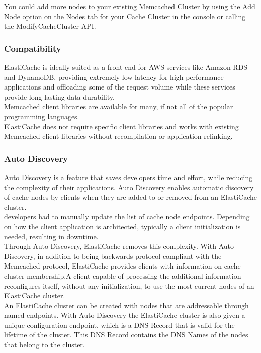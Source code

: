 \documentclass[12pt, letterpaper, twoside]{article}
\begin{document}
You could add more nodes to your existing Memcached Cluster by using the Add Node option on the Nodes tab for your Cache 
Cluster in the console or calling the ModifyCacheCluster API.\\

\subsubsection{Compatibility}
ElastiCache is ideally suited as a front end for AWS services like Amazon RDS and DynamoDB, providing extremely low latency for 
high-performance applications and offloading some of the request volume while these services provide long-lasting data durability.\\

Memcached client libraries are available for many, if not all of the popular programming languages.\\

ElastiCache does not require specific client libraries and works with existing Memcached client libraries without recompilation 
or application relinking.

\subsubsection{Auto Discovery}
Auto Discovery is a feature that saves developers time and effort, while reducing the complexity of their applications. Auto 
Discovery enables automatic discovery of cache nodes by clients when they are added to or removed from an ElastiCache cluster.\\
developers had to manually update the list of cache node endpoints. Depending on how the client application is architected, typically 
a client initialization is needed, resulting in downtime.\\
Through Auto Discovery, ElastiCache removes this complexity. With Auto Discovery, in addition to being backwards protocol compliant 
with the Memcached protocol, ElastiCache provides clients with information on cache cluster membership.A client capable of processing 
the additional information reconfigures itself, without any initialization, to use the most current nodes of an ElastiCache cluster.\\

An ElastiCache cluster can be created with nodes that are addressable through named endpoints. With Auto Discovery the ElastiCache 
cluster is also given a unique configuration endpoint, which is a DNS Record that is valid for the lifetime of the cluster. This DNS 
Record contains the DNS Names of the nodes that belong to the cluster.\\
\end{document}
